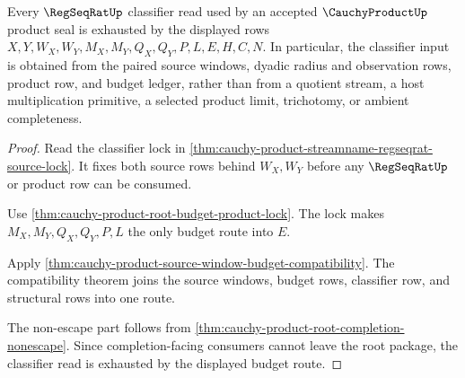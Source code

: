 \begin{theorem}
\label{thm:cauchy-product-regseqrat-product-budget-exhaustion}
Every $\RegSeqRatUp$ classifier read used by an accepted $\CauchyProductUp$ product seal is exhausted by the displayed rows $X,Y,W_X,W_Y,M_X,M_Y,Q_X,Q_Y,P,L,E,H,C,N$. In particular, the classifier input is obtained from the paired source windows, dyadic radius and observation rows, product row, and budget ledger, rather than from a quotient stream, a host multiplication primitive, a selected product limit, trichotomy, or ambient completeness.
\end{theorem}
\begin{proof}
Read the classifier lock in \autoref{thm:cauchy-product-streamname-regseqrat-source-lock}. It fixes both source rows behind $W_X,W_Y$ before any $\RegSeqRatUp$ or product row can be consumed.

Use \autoref{thm:cauchy-product-root-budget-product-lock}. The lock makes $M_X,M_Y,Q_X,Q_Y,P,L$ the only budget route into $E$.

Apply \autoref{thm:cauchy-product-source-window-budget-compatibility}. The compatibility theorem joins the source windows, budget rows, classifier row, and structural rows into one route.

The non-escape part follows from \autoref{thm:cauchy-product-root-completion-nonescape}. Since completion-facing consumers cannot leave the root package, the classifier read is exhausted by the displayed budget route.
\end{proof}

